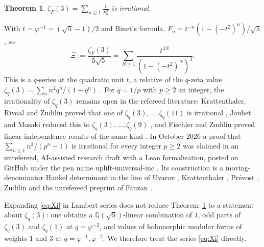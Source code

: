 \documentclass[11pt]{amsart}
\newtheorem{theorem}{Theorem}[section]
\theoremstyle{definition}
\theoremstyle{remark}
\numberwithin{equation}{section}
\newcommand{\QQ}{\mathbb{Q}}
\begin{document}
\begin{theorem}\label{thm:main}
$\displaystyle\zeta_F(3)=\sum_{n\ge1}\frac1{F_n^3}$ is irrational.
\end{theorem}

With $t=\varphi^{-1}=(\sqrt5-1)/2$ and Binet's formula, $F_n=t^{-n}(1-(-t^2)^n)/\sqrt5$, so
\begin{equation}\label{eq:Xi}
\Xi:=\frac{\zeta_F(3)}{5\sqrt5}=\sum_{N\ge1}\frac{t^{3N}}{(1-(-t^2)^N)^3}.
\end{equation}
This is a $q$-series at the quadratic unit $t$, a relative of the $q$-zeta value
$\zeta_q(3)=\sum_n n^2q^n/(1-q^n)$ \cite{KRZ06}. For $q=1/p$ with $p\ge2$ an integer, the irrationality of
$\zeta_q(3)$ remains open in the refereed literature: Krattenthaler, Rivoal and Zudilin proved that one of
$\zeta_q(3),\dots,\zeta_q(11)$ is irrational \cite{KRZ06}, Jouhet and Mosaki reduced this to
$\zeta_q(3),\dots,\zeta_q(9)$ \cite{JM10}, and Fischler and Zudilin proved linear independence results of the same
kind \cite{FZ10}. In October 2026 a proof that $\sum_{n\ge1}n^2/(p^n-1)$ is irrational for every integer $p\ge2$ was
claimed in an unrefereed, AI-assisted research draft with a Lean formalisation, posted on GitHub under the pen name
uplift-universal-inc \cite{UPL,QZ3}. Its construction is a moving-denominator Hankel determinant in the line of
Uvarov \cite{Uva69}, Krattenthaler \cite{Kra21}, Pr\'evost \cite{Pre96}, Zudilin \cite{Zud16,Zud17} and the unrefereed
preprint of Fauzan \cite{Fau}.

Expanding \eqref{eq:Xi} in Lambert series does not reduce Theorem~\ref{thm:main} to a statement about $\zeta_q(3)$: one
obtains a $\QQ(\sqrt5)$-linear combination of $1$, odd parts of $\zeta_q(3)$ and $\zeta_q(1)$ at $q=\varphi^{-2}$, and
values of holomorphic modular forms of weights $1$ and $3$ at $q=\varphi^{-1},\varphi^{-2}$. We therefore treat the
series \eqref{eq:Xi} directly.
\end{document}
